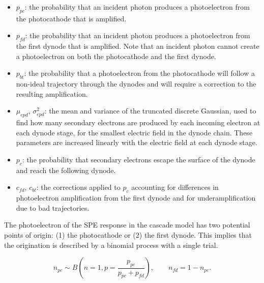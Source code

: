 \begin{itemize}
    \item $p_{pc}$: the probability that an incident photon produces a photoelectron from the photocathode that is amplified.
    \item $p_{fd}$: the probability that an incident photon produces a photoelectron from the first dynode that is amplified.  Note that an incident photon cannot create a photoelectron on both the photocathode and the first dynode.
    \item $p_{bt}$: the probability that a photoelectron from the photocathode will follow a non-ideal trajectory through the dynodes and will require a correction to the resulting amplification.
    \item $\mu_{epd}$, $\sigma_{epd}^2$: the mean and variance of the truncated discrete Gaussian, used to find how many secondary electrons are produced by each incoming electron at each dynode stage, for the smallest electric field in the dynode chain.  These parameters are increased linearly with the electric field at each dynode stage.
    \item $p_c$: the probability that secondary electrons escape the surface of the dynode and reach the following dynode.
    \item $c_{fd}$, $c_{bt}$: the corrections applied to $p_c$ accounting for differences in photoelectron amplification from the first dynode and for underamplification due to bad trajectories.


    
\end{itemize}


The photoelectron of the SPE response in the cascade model has two potential points of origin: (1) the photocathode or (2) the first dynode.  This implies that the origination is described by a binomial process with a single trial.

\begin{equation}
        n_{pc} \sim B\left(n=1, p=\frac{p_{pc}}{p_{pc}+p_{fd}}\right), \qquad
        n_{fd} = 1 - n_{pc}.
\end{equation}

